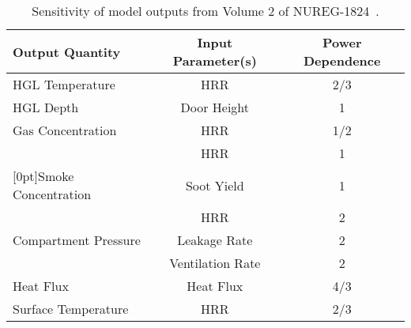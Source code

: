 \documentclass[fleqn,b5paper]{article}
\begin{document}
\begin{table}[ht]
\caption{Sensitivity of model outputs from Volume 2 of NUREG-1824~\cite{NUREG_1824}. }
\begin{center}
\begin{tabular}{|l|c|c|}
\hline
Output Quantity                                 & Input Parameter(s)    & Power Dependence \\ \hline \hline
HGL Temperature                                 & HRR                   & 2/3    \\ \hline
HGL Depth                                       & Door Height           & 1      \\ \hline
Gas Concentration                               & HRR                   & 1/2    \\ \hline
                                                & HRR                   & 1      \\ \cline{2-3}
\raisebox{1.5ex}[0pt]{Smoke Concentration}      & Soot Yield            & 1      \\ \hline
                                                & HRR                   & 2      \\ \cline{2-3}
Compartment Pressure                            & Leakage Rate          & 2      \\ \cline{2-3}
                                                & Ventilation Rate      & 2      \\ \hline
Heat Flux                                       & Heat Flux             & 4/3    \\ \hline
Surface Temperature                             & HRR                   & 2/3    \\ \hline
\end{tabular}
\end{center}
\label{Parameter_Uncertainty}
\end{table}
\end{document}
